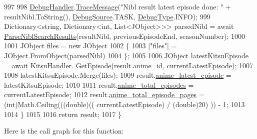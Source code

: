 \begin{DoxyCode}
997 
998                 \mbox{\hyperlink{class_little_weeb_library_1_1_handlers_1_1_anime_profile_handler_a0b0ae3c3838d26351485e6dfc566a632}{DebugHandler}}.\mbox{\hyperlink{interface_little_weeb_library_1_1_handlers_1_1_i_debug_handler_a2e405bc3492e683cd3702fae125221bc}{TraceMessage}}(\textcolor{stringliteral}{"Nibl result latest episode done: "} + 
      resultNibl.ToString(), \mbox{\hyperlink{namespace_little_weeb_library_1_1_handlers_a2a6ca0775121c9c503d58aa254d292be}{DebugSource}}.TASK, \mbox{\hyperlink{namespace_little_weeb_library_1_1_handlers_ab66019ed40462876ec4e61bb3ccb0a62}{DebugType}}.INFO);
999                 Dictionary<string, Dictionary<int, List<JObject>>> parsedNibl =  await 
      \mbox{\hyperlink{class_little_weeb_library_1_1_handlers_1_1_anime_profile_handler_a92412693abdf9ea697e6b793b71d468f}{ParseNiblSearchResults}}(resultNibl, previousEpisodeEnd, seasonNumber);
1000 
1001                 JObject files = \textcolor{keyword}{new} JObject
1002                 \{
1003                     [\textcolor{stringliteral}{"files"}] = JObject.FromObject(parsedNibl)
1004                 \};
1005 
1006                 JObject latestKitsuEpisode = await \mbox{\hyperlink{class_little_weeb_library_1_1_handlers_1_1_anime_profile_handler_adf3e37895c7834c51b436beed19d1aa5}{KitsuHandler}}.
      \mbox{\hyperlink{interface_little_weeb_library_1_1_handlers_1_1_i_kitsu_handler_a9f182eabb098e98f566c8add1695bb36}{GetEpisode}}(result.\mbox{\hyperlink{class_little_weeb_library_1_1_models_1_1_json_kitsu_anime_info_a6a3974cec731d5a54452608449091130}{anime\_id}}, currentLatestEpisode);
1007 
1008                 latestKitsuEpisode.Merge(files);
1009                 result.\mbox{\hyperlink{class_little_weeb_library_1_1_models_1_1_json_kitsu_anime_info_a53ef2cd169a3c8be49c809a10dbd1701}{anime\_latest\_episode}} = latestKitsuEpisode;
1010 
1011                 result.\mbox{\hyperlink{class_little_weeb_library_1_1_models_1_1_json_kitsu_anime_info_a05eac71810dc6aa9ae33a224b5a6957c}{anime\_total\_episodes}} = currentLatestEpisode;
1012                 result.\mbox{\hyperlink{class_little_weeb_library_1_1_models_1_1_json_kitsu_anime_info_a359be736ccb4ae5ccf50f5d754cd4973}{anime\_total\_episode\_pages}} = (int)Math.Ceiling(((\textcolor{keywordtype}{double})((
      currentLatestEpisode) / (\textcolor{keywordtype}{double})20) )) - 1;
1013 
1014             \}
1015 
1016             \textcolor{keywordflow}{return} result;
1017         \}
\end{DoxyCode}
Here is the call graph for this function\+:\nopagebreak
